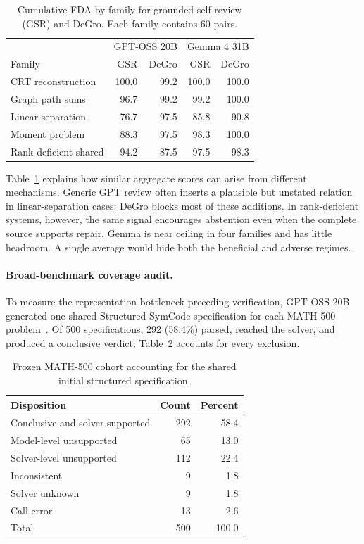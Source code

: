 \documentclass[sigconf,anonymous]{aamas}
\begin{document}
\begin{table}[t]
\centering
\caption{Cumulative FDA by family for grounded self-review (GSR) and DeGro. Each family contains 60 pairs.}
\label{tab:family}
\small
\begin{tabular}{lrrrr}
\toprule
& \multicolumn{2}{c}{GPT-OSS 20B} & \multicolumn{2}{c}{Gemma 4 31B}\\
Family & GSR & DeGro & GSR & DeGro\\
\midrule
CRT reconstruction & 100.0 & 99.2 & 100.0 & 100.0\\
Graph path sums & 96.7 & 99.2 & 99.2 & 100.0\\
Linear separation & 76.7 & 97.5 & 85.8 & 90.8\\
Moment problem & 88.3 & 97.5 & 98.3 & 100.0\\
Rank-deficient shared & 94.2 & 87.5 & 97.5 & 98.3\\
\bottomrule
\end{tabular}
\end{table}

Table~\ref{tab:family} explains how similar aggregate scores can arise from different mechanisms.  Generic GPT review often inserts a plausible but unstated relation in linear-separation cases; DeGro blocks most of these additions.  In rank-deficient systems, however, the same signal encourages abstention even when the complete source supports repair.  Gemma is near ceiling in four families and has little headroom.  A single average would hide both the beneficial and adverse regimes.

\paragraph{Broad-benchmark coverage audit.}
To measure the representation bottleneck preceding verification, GPT-OSS 20B generated one shared Structured SymCode specification for each MATH-500 problem~\cite{hendrycks2021math}.  Of 500 specifications, 292 (58.4\%) parsed, reached the solver, and produced a conclusive verdict; Table~\ref{tab:coverage} accounts for every exclusion.

\begin{table}[t]
\centering
\caption{Frozen MATH-500 cohort accounting for the shared initial structured specification.}
\label{tab:coverage}
\small
\begin{tabular}{lrr}
\toprule
Disposition & Count & Percent\\
\midrule
Conclusive and solver-supported & 292 & 58.4\\
Model-level unsupported & 65 & 13.0\\
Solver-level unsupported & 112 & 22.4\\
Inconsistent & 9 & 1.8\\
Solver unknown & 9 & 1.8\\
Call error & 13 & 2.6\\
\midrule
Total & 500 & 100.0\\
\bottomrule
\end{tabular}
\end{table}
\end{document}
